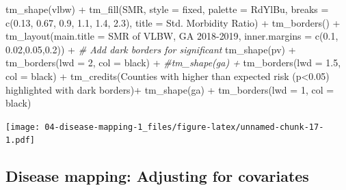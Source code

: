 \documentclass[
]{book}
\newenvironment{Shaded}{\begin{snugshade}}{\end{snugshade}}
\newcommand{\AttributeTok}[1]{\textcolor[rgb]{0.77,0.63,0.00}{#1}}
\newcommand{\CommentTok}[1]{\textcolor[rgb]{0.56,0.35,0.01}{\textit{#1}}}
\newcommand{\DecValTok}[1]{\textcolor[rgb]{0.00,0.00,0.81}{#1}}
\newcommand{\FloatTok}[1]{\textcolor[rgb]{0.00,0.00,0.81}{#1}}
\newcommand{\FunctionTok}[1]{\textcolor[rgb]{0.00,0.00,0.00}{#1}}
\newcommand{\NormalTok}[1]{#1}
\newcommand{\SpecialCharTok}[1]{\textcolor[rgb]{0.00,0.00,0.00}{#1}}
\newcommand{\StringTok}[1]{\textcolor[rgb]{0.31,0.60,0.02}{#1}}
\begin{document}
\begin{Shaded}
\begin{Highlighting}[]
\FunctionTok{tm\_shape}\NormalTok{(vlbw) }\SpecialCharTok{+}
  \FunctionTok{tm\_fill}\NormalTok{(}\StringTok{\textquotesingle{}SMR\textquotesingle{}}\NormalTok{,}
          \AttributeTok{style =} \StringTok{\textquotesingle{}fixed\textquotesingle{}}\NormalTok{,}
          \AttributeTok{palette =} \StringTok{\textquotesingle{}{-}RdYlBu\textquotesingle{}}\NormalTok{,}
          \AttributeTok{breaks =} \FunctionTok{c}\NormalTok{(}\FloatTok{0.13}\NormalTok{, }\FloatTok{0.67}\NormalTok{, }\FloatTok{0.9}\NormalTok{, }\FloatTok{1.1}\NormalTok{, }\FloatTok{1.4}\NormalTok{, }\FloatTok{2.3}\NormalTok{),}
          \AttributeTok{title =} \StringTok{\textquotesingle{}Std. Morbidity Ratio\textquotesingle{}}\NormalTok{) }\SpecialCharTok{+} 
  \FunctionTok{tm\_borders}\NormalTok{() }\SpecialCharTok{+}
  \FunctionTok{tm\_layout}\NormalTok{(}\AttributeTok{main.title =} \StringTok{\textquotesingle{}SMR of VLBW, GA 2018{-}2019\textquotesingle{}}\NormalTok{,}
            \AttributeTok{inner.margins =} \FunctionTok{c}\NormalTok{(}\FloatTok{0.1}\NormalTok{, }\FloatTok{0.02}\NormalTok{,}\FloatTok{0.05}\NormalTok{,}\FloatTok{0.2}\NormalTok{)) }\SpecialCharTok{+}
  \CommentTok{\# Add dark borders for significant}
  \FunctionTok{tm\_shape}\NormalTok{(pv) }\SpecialCharTok{+}
  \FunctionTok{tm\_borders}\NormalTok{(}\AttributeTok{lwd =} \DecValTok{2}\NormalTok{, }\AttributeTok{col =} \StringTok{\textquotesingle{}black\textquotesingle{}}\NormalTok{) }\SpecialCharTok{+}
  \CommentTok{\#tm\_shape(ga) + }
  \FunctionTok{tm\_borders}\NormalTok{(}\AttributeTok{lwd =} \FloatTok{1.5}\NormalTok{, }\AttributeTok{col =} \StringTok{\textquotesingle{}black\textquotesingle{}}\NormalTok{) }\SpecialCharTok{+}
  \FunctionTok{tm\_credits}\NormalTok{(}\StringTok{\textquotesingle{}Counties with higher than expected risk (p\textless{}0.05) highlighted with dark borders\textquotesingle{}}\NormalTok{)}\SpecialCharTok{+}
  \FunctionTok{tm\_shape}\NormalTok{(ga) }\SpecialCharTok{+}
  \FunctionTok{tm\_borders}\NormalTok{(}\AttributeTok{lwd =} \DecValTok{1}\NormalTok{, }\AttributeTok{col =} \StringTok{\textquotesingle{}black\textquotesingle{}}\NormalTok{)}
\end{Highlighting}
\end{Shaded}

\texttt{[image: 04-disease-mapping-1\_files/figure-latex/unnamed-chunk-17-1.pdf]}

\hypertarget{disease-mapping-adjusting-for-covariates}{%
\subsection{Disease mapping: Adjusting for covariates}\label{disease-mapping-adjusting-for-covariates}}
\end{document}

